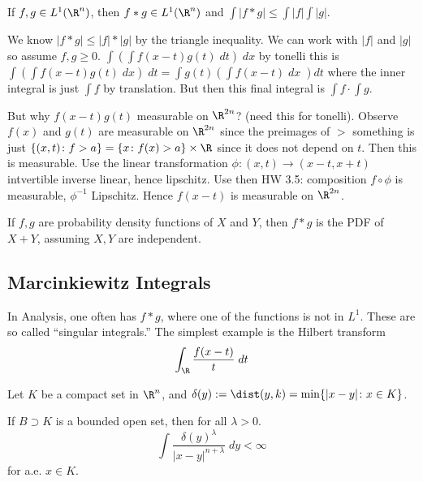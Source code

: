 \begin{thm}
If $f,g \in L^1(\R^n)$, then $f*g \in L^1(\R^n)$ and $\int |f*g| \leq \int |f| \int |g|$.
\end{thm}

\pf We know $|f*g| \leq |f| * |g|$ by the triangle inequality. We can work with $|f|$ and $|g|$ so assume $f,g \geq 0$. $\int (\int f(x-t) g(t) \; dt) \; dx$ by tonelli this is $\int (\int f(x-t) g(t) \; dx ) \; dt = \int g(t) (\int f(x-t) \; dx \; )dt$ where the inner integral is just $\int f$ by translation. But then this final integral is $\int f \cdot \int g$. 

But why $f(x-t)g(t)$ measurable on $\R^{2n}$? (need this for tonelli). Observe $f(x)$ and $g(t)$ are measurable on $\R^{2n}$ since the preimages of $>$ something is just $\{(x,t) \colon f>a\}= \{x \colon f(x)>a\} \times \R$ since it does not depend on $t$. Then this is measurable. Use the linear transformation $\phi: (x,t) \to (x-t,x+t)$ intvertible inverse linear, hence lipschitz. Use then HW 3.5: composition $f \circ \phi$ is measurable, $\phi^{-1}$ Lipschitz. Hence $f(x-t)$ is measurable on $\R^{2n}$. 






If $f,g$ are probability density functions of $X$ and $Y$, then $f*g$ is the PDF of $X+Y$, assuming $X,Y$ are independent. 





\subsection{Marcinkiewitz Integrals}

In Analysis, one often has $f*g$, where one of the functions is not in $L^1$. These are so called ``singular integrals.'' The simplest example is the Hilbert transform
	\[
	\int_\R \dfrac{f(x-t)}{t} \; dt
	\]


Let $K$ be a compact set in $\R^n$, and $\delta(y):= \dist(y,k)= \min\{|x-y| \colon x \in K\}$. 



\begin{thm}
If $B \supset K$ is a bounded open set, then for all $\lambda > 0$. 
	\[
	\int \dfrac{\delta(y)^\lambda}{|x-y|^{n+\lambda}} \; dy < \infty
	\]
for a.e. $x \in K$.
\end{thm}

